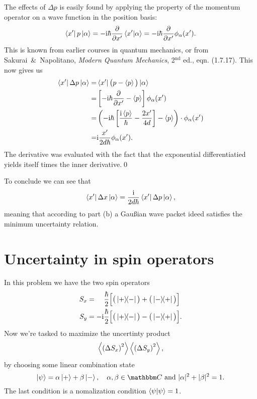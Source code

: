 \documentclass[11pt,letter, swedish, english
]{article}
\begin{document}
The effects of $\Delta{p}$ is easily found by applying the property of
the momentum operator on a wave function in the position basis:
\begin{equation}
\bra{x'}p\ket{\alpha} = -\mathrm{i}\hbar \pdv{x'} \braket{x'}{\alpha} 
= -\mathrm{i}\hbar \pdv{x'} \phi_\alpha(x').
\end{equation}
This is known from earlier courses in quantum mechanics, or from
Sakurai~\&~Napolitano, \textit{Modern Quantum Mechanics}, 2$^\text{nd}$
ed., eqn. (1.7.17). This now gives us
\begin{equation}
\begin{aligned}
\bra{x'}\Delta{p}\ket{\alpha} =& \bra{x'}\big(p-\ev{p}\big)\ket{\alpha}\\
=& \left[-\ii\hbar \pdv{x'} - \ev{p}\right] \phi_\alpha(x')\\
=& \left(
   -\ii\hbar\left[ \frac{\ii\ev{p}}{\hbar} - \frac{2x'}{4d}\right] 
   - \ev{p}\right)\cdot \phi_\alpha(x')\\
=& \ii\frac{x'}{2d\hbar}\phi_\alpha(x').
\end{aligned}
\end{equation}
The derivative was evaluated with the fact that the exponential
differentiatied yields itself times the inner derivative.\qed

To conclude we can see that
\begin{equation}
\bra{x'}\Delta{x}\ket{\alpha} = \frac{\mathrm{i}}{2d\hbar} \bra{x'}\Delta{p}\ket{\alpha},
\end{equation}
meaning that according to part (b) a Gaußian wave packet ideed
satisfies the minimum uncertainty relation.



\section{Uncertainty in spin operators}
In this problem we have the two spin operators
\begin{equation}
\begin{aligned}
S_x &= \phantom{-\ii}\frac{\hbar}{2}\Big[\big(\ketbra{+}{-}\big) + \big(\ketbra{-}{+}\big) \Big]\\
S_y &= -\ii\frac{\hbar}{2}\Big[\big(\ketbra{+}{-}\big) - \big(\ketbra{-}{+}\big) \Big].
\end{aligned}
\end{equation}
Now we're tasked to maximize the uncertinty product
\begin{equation}
\ev{\left(\Delta{S_x}\right)^2}\ev{\left(\Delta{S_y}\right)^2},
\end{equation}
by choosing some linear combination state
\begin{equation}
\ket{\psi}=\alpha\ket{+}+\beta\ket{-} 
   \qcomma \alpha,\beta\in\C \text{ and } |\alpha|^2+|\beta|^2 = 1.
\end{equation}
The last condition is a nomalization condition $\braket{\psi}=1$.
\end{document}
